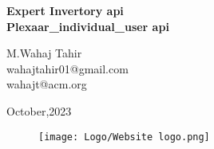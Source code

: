 \begin{Titlepage}
\begin{center}
    \vspace*{2cm}
    
    \textbf{\Huge Expert Invertory api\\Plexaar\_individual\_user api }\\
    \vspace*{2cm}
    
      
      \vspace{0.2cm}
      \begin{center}
          \large M.Wahaj Tahir\\wahajtahir01@gmail.com\\wahajt@acm.org
      \end{center} 
    
    \vspace{1.5cm}
    \begin{center}
    \large October,2023 
    \end{center}
    
    \vfill
    \vspace{0.8cm}
    \begin{figure}[hb]
        \centering
        \texttt{[image: Logo/Website logo.png]}
    \end{figure}
    \end{center}
\end{Titlepage}








